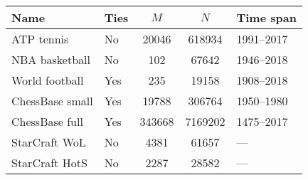\begin{tabular}{l lS[table-format=6.0]S[table-format=7.0]l}
  \toprule
  Name            & Ties &    $M$ &     $N$ &  Time span \\
  \midrule
  ATP tennis      & No   &  20046 &  618934 & 1991--2017 \\
  NBA basketball  & No   &    102 &   67642 & 1946--2018 \\
  World football  & Yes  &    235 &   19158 & 1908--2018 \\
  ChessBase small & Yes  &  19788 &  306764 & 1950--1980 \\
  ChessBase full  & Yes  & 343668 & 7169202 & 1475--2017 \\
  \addlinespace
  StarCraft WoL   & No   &   4381 &   61657 & ---        \\
  StarCraft HotS  & No   &   2287 &   28582 & ---        \\
  \bottomrule
\end{tabular}
